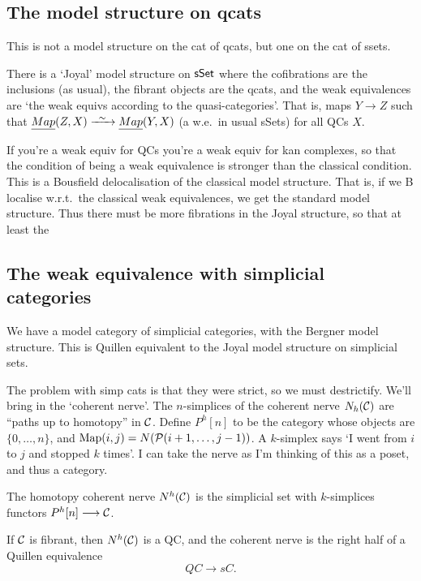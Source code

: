 \documentclass[11pt]{article}
\begin{document}
\begin{SaulInftyOneCats}
\subsection*{The model structure on qcats}
This is not a model structure on the cat of qcats, but one on the cat of ssets.
\begin{thm*}[Thmdef]
There is a  `Joyal' model structure on $\operatorname{{\mathsf{sSet}}}$ where the cofibrations are the inclusions (as usual), the fibrant objects are the qcats, and the weak equivalences are `the weak equivs according to the quasi-categories'. That is, maps $Y\to  Z$ such that $\underline{Map}(Z,X)\weakequiv\underline{Map}(Y,X)$ (a w.e.\ in usual sSets) for all QCs $X$.
\end{thm*}
If you're a weak equiv for QCs you're a weak equiv for kan complexes, so that the condition of being a weak equivalence is stronger than the classical condition. This is a Bousfield delocalisation of the classical model structure. That is, if we B localise w.r.t.\ the classical weak equivalences, we get the standard model structure. Thus there must be more fibrations in the Joyal structure, so that at least the 
\subsection*{The weak equivalence with simplicial categories}
We have a model category of simplicial categories, with the Bergner model structure. This is Quillen equivalent to the Joyal model structure on simplicial sets.

The problem with simp cats is that they were strict, so we must destrictify. We'll bring in the `coherent nerve'. The $n$-simplices of the coherent nerve $N_h(\mathcal{C})$ are ``paths up to homotopy'' in $\mathcal{C}$. Define $P^h[n]$ to be the category whose objects are $\{0,\ldots,n\}$, and $\operatorname{Map}(i,j)=N(\mathcal{P}(i+1,\ldots,j-1))$. A $k$-simplex says `I went from $i$ to $j$ and stopped $k$ times'. I can take the nerve as I'm thinking of this as a poset, and thus a category.

The homotopy coherent nerve $N^h(\mathcal{C})$ is the simplicial set with $k$-simplices functors $P^h[n]\longrightarrow\mathcal{C}$.
\begin{thm*}
If $\mathcal{C}$ is fibrant, then $N^h(\mathcal{C})$ is a QC, and the coherent nerve is the right half of a Quillen equivalence
\[QC\to sC.\]
\end{thm*}


\pagebreak
\end{SaulInftyOneCats}
\end{document}
